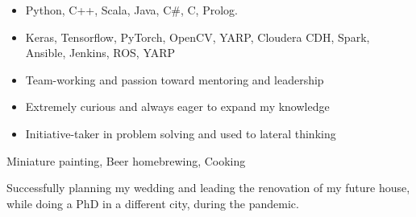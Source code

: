 \documentclass[10pt,a4paper,ragged2e]{altacv}
\begin{document}
\smallskip
\begin{itemize}
  \item Python, C++, Scala, Java, C\#, C, Prolog.
        \smallskip
  \item Keras, Tensorflow, PyTorch, OpenCV, YARP, Cloudera CDH, Spark, Ansible, Jenkins, ROS, YARP
        \smallskip
\end{itemize}
\smallskip
\begin{itemize}
  \item Team-working and passion toward mentoring and leadership
        \smallskip
  \item Extremely curious and always eager to expand my knowledge
        \smallskip
  \item Initiative-taker in problem solving and used to lateral thinking
\end{itemize}

Miniature painting, Beer homebrewing, Cooking

\smallskip
Successfully planning my wedding and leading the renovation of my future house, while doing a PhD in a different city, during the pandemic.

\clearpage

\begin{fullwidth}


  \printbibliography[heading=pubtype,title=\empty, type=misc]


  \nocite{*}

  \printbibliography[heading=pubtype,title={\printinfo{\faFileTextO}{Journal}}, type=article]

  \divider

  \printbibliography[heading=pubtype,title={\printinfo{\faFileTextO}{Conference Proceedings}}, type=inproceedings]

\end{fullwidth}
\end{document}
